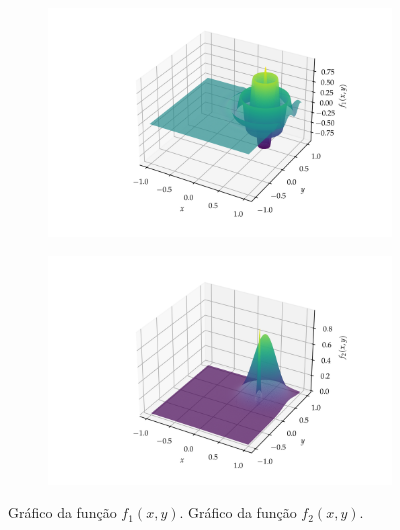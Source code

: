 \begin{figure}
  \begin{subfigure}{\textwidth}
    \centering
    \includegraphics[width=\textwidth]{imagens/graph_damped_cossine.png}
    \caption{}
    \label{fig:graph_damped_cossine}
  \end{subfigure}
  \begin{subfigure}{\textwidth}
    \centering
    \includegraphics[width=\textwidth]{imagens/graph_near_gaussians.png}
    \caption{}
    \label{fig:graph_near_gaussians}
  \end{subfigure}
  \caption{
     Gráfico da função $f_1(x,y)$.
     Gráfico da função $f_2(x,y)$.
  }
\end{figure}

